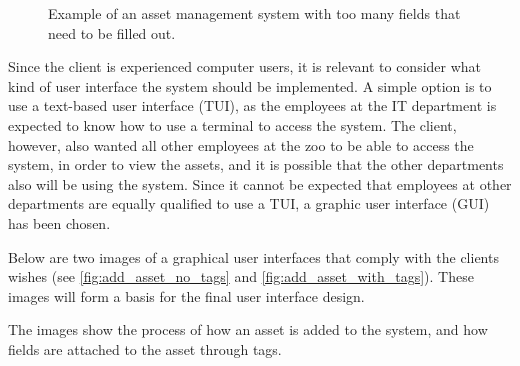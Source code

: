 \begin{figure}[H]
    \centering
    \caption{Example of an asset management system with too many fields that need to be filled out. \cite{SnipeIT}}
    \label{fig:too-many-fields}
\end{figure}

Since the client is experienced computer users, it is relevant to consider what kind of user interface the system should be implemented. A simple option is to use a text-based user interface (TUI), as the employees at the IT department is expected to know how to use a terminal to access the system. The client, however, also wanted all other employees at the zoo to be able to access the system, in order to view the assets, and it is possible that the other departments also will be using the system. Since it cannot be expected that employees at other departments are equally qualified to use a TUI, a graphic user interface (GUI) has been chosen. 
\par
Below are two images of a graphical user interfaces that comply with the clients wishes (see \autoref{fig:add_asset_no_tags} and \autoref{fig:add_asset_with_tags}). These images will form a basis for the final user interface design.
\par
The images show the process of how an asset is added to the system, and how fields are attached to the asset through tags.

